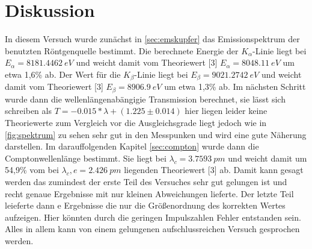 \section{Diskussion}
\label{sec:diskussion}
In diesem Versuch wurde zunächst in \autoref{sec:emskupfer} das Emissionspektrum der
benutzten Röntgenquelle bestimmt. Die berechnete Energie der $K_{\alpha}$-Linie liegt bei
$E_{\alpha}=\SI[]{8181.4462}[]{eV}$ und weicht damit vom Theoriewert [3] $E_{\alpha}=\SI[]{8048.11}[]{eV}$
um etwa 1,6\% ab. Der Wert für die $K_{\beta}$-Linie liegt bei $E_{\beta}=\SI[]{9021.2742}[]{eV}$ 
und weicht damit vom Theoriewert [3] $E_{\beta}=\SI[]{8906.9}[]{eV}$ 
um etwa 1,3\% ab. Im nächsten Schritt wurde dann die wellenlängenabängigie Transmission
berechnet, sie lässt sich schreiben als $T=-0.015*\lambda+(1.225 \pm 0.014)$ hier liegen leider
keine Theoriewerte zum Vergleich vor die Ausgleichsgrade liegt jedoch wie in \autoref{fig:spektrum}
zu sehen sehr gut in den Messpunken und wird eine gute Näherung darstellen. Im darauffolgenden Kapitel
\autoref{sec:compton} wurde dann die Comptonwellenlänge bestimmt. Sie liegt bei $\lambda_c=\SI[]{3.7593}[]{pm}$
und weicht damit um 54,9\% vom bei $\lambda_c,e=\SI[]{2.426}[]{pm}$ liegenden Theoriewert [3] ab.
Damit kann gesagt werden das zumindest der erste Teil des Versuches sehr gut gelungen ist und
recht genaue Ergebnisse mit nur kleinen Abweichungen lieferte. Der letzte Teil leieferte dann e
Ergebnisse die nur die Größenordnung des korrekten Wertes aufzeigen. Hier könnten durch die geringen 
Impulszahlen Fehler entstanden sein. Alles in allem kann von einem gelungenen aufschlussreichen 
Versuch gesprochen werden.